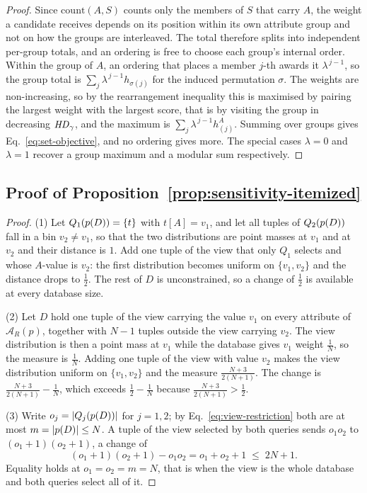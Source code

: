 \begin{proof}
Since $\mathrm{count}(A,S)$ counts only the members of $S$ that carry $A$, the weight a candidate receives depends on its position within its own attribute group and not on how the groups are interleaved.
The total therefore splits into independent per-group totals, and an ordering is free to choose each group's internal order.
Within the group of $A$, an ordering that places a member $j$-th awards it $\lambda^{\,j-1}$, so the group total is $\sum_j \lambda^{\,j-1}h_{\sigma(j)}$ for the induced permutation $\sigma$.
The weights are non-increasing, so by the rearrangement inequality this is maximised by pairing the largest weight with the largest score, that is by visiting the group in decreasing $\mathit{HD}_\gamma$, and the maximum is $\sum_j \lambda^{\,j-1}h^A_{(j)}$.
Summing over groups gives Eq.~\eqref{eq:set-objective}, and no ordering gives more.
The special cases $\lambda=0$ and $\lambda=1$ recover a group maximum and a modular sum respectively.
\end{proof}

\subsection{Proof of Proposition~\ref{prop:sensitivity-itemized}}
\label{app:proof-classical}

\begin{proof}
(1) Let $Q_1(p(D))=\{t\}$ with $t[A]=v_1$, and let all tuples of $Q_2(p(D))$ fall in a bin $v_2\ne v_1$, so that the two distributions are point masses at $v_1$ and at $v_2$ and their distance is $1$.
Add one tuple of the view that only $Q_1$ selects and whose $A$-value is $v_2$: the first distribution becomes uniform on $\{v_1,v_2\}$ and the distance drops to $\tfrac12$.
The rest of $D$ is unconstrained, so a change of $\tfrac12$ is available at every database size.

(2) Let $D$ hold one tuple of the view carrying the value $v_1$ on every attribute of $\mathcal{A}_R(p)$, together with $N-1$ tuples outside the view carrying $v_2$.
The view distribution is then a point mass at $v_1$ while the database gives $v_1$ weight $\tfrac1N$, so the measure is $\tfrac1N$.
Adding one tuple of the view with value $v_2$ makes the view distribution uniform on $\{v_1,v_2\}$ and the measure $\tfrac{N+3}{2(N+1)}$.
The change is $\tfrac{N+3}{2(N+1)}-\tfrac1N$, which exceeds $\tfrac12-\tfrac1N$ because $\tfrac{N+3}{2(N+1)}>\tfrac12$.

(3) Write $o_j=|Q_j(p(D))|$ for $j=1,2$; by Eq.~\eqref{eq:view-restriction} both are at most $m=|p(D)|\le N$.
A tuple of the view selected by both queries sends $o_1o_2$ to $(o_1+1)(o_2+1)$, a change of
\[
(o_1+1)(o_2+1)-o_1o_2=o_1+o_2+1\;\le\;2N+1 .
\]
Equality holds at $o_1=o_2=m=N$, that is when the view is the whole database and both queries select all of it.
\end{proof}

